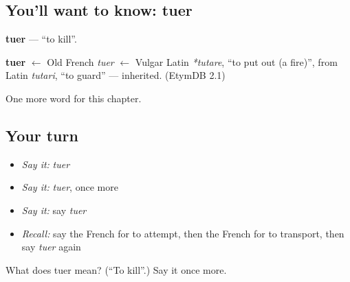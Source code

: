 \subsection*{You'll want to know: tuer}
\textbf{tuer} — \textquotedblleft{}to kill\textquotedblright{}.

\begin{cousinweb}
\textbf{tuer} $\leftarrow$ Old French \emph{tuer} $\leftarrow$ Vulgar Latin \emph{*tutare}, \textquotedblleft{}to put out (a fire)\textquotedblright{}, from Latin \emph{tutari}, \textquotedblleft{}to guard\textquotedblright{} — inherited. (EtymDB 2.1)
\end{cousinweb}

\begin{grammarlens}[title={What you've built}]
One more word for this chapter.
\end{grammarlens}

\subsection*{Your turn}
\begin{itemize}
\raggedright
  \item \emph{Say it:} \emph{tuer}
  \item \emph{Say it:} \emph{tuer}, once more
  \item \emph{Say it:} say \emph{tuer}
  \item \emph{Recall:} say the French for to attempt, then the French for to transport, then say \emph{tuer} again
\end{itemize}

\begin{tcolorbox}[breakable,colback=teal!4,colframe=teal!35!black,title={Before you move on}]
What does tuer mean? (\textquotedblleft{}To kill\textquotedblright{}.) Say it once more.
\end{tcolorbox}
